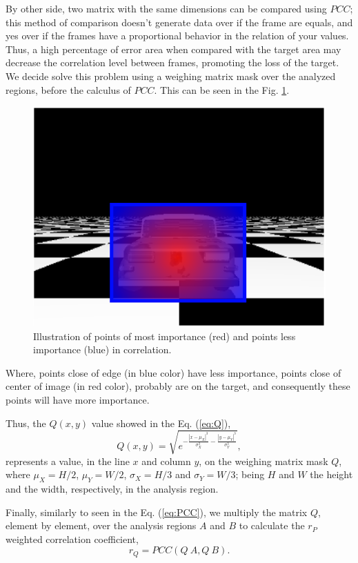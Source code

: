 By other side, two matrix with the same dimensions can be compared using $PCC$; 
this method of comparison doesn't generate data over if the frame are equals,
and yes over if the frames have a proportional behavior in the relation of your values. 
Thus, a high percentage of error area when compared with the target area 
may decrease the correlation level between frames, promoting the loss of the target. 
We decide solve this problem using a weighing matrix mask over the analyzed regions, 
before the calculus of $PCC$. This can be seen in the Fig. \ref{fig:errorpondered}.
\begin{figure}[H]
\includegraphics[width=\columnwidth]{images/imageErrorcontroled.eps}
\caption{Illustration of points of most importance (red) and points less importance (blue) in correlation.}
\label{fig:errorpondered}
\end{figure}
Where, points close of edge (in blue color) have less importance, 
points close of center of image (in red color), probably are on the target, and consequently
these points will have more importance. 

Thus, the $Q(x,y)$ value showed in the Eq. (\ref{eq:Q}), 
\begin{equation}\label{eq:Q}
 Q(x,y) = \sqrt{e^{ -\frac{|x-\mu_X|^3}{\sigma_X^3}-\frac{|y-\mu_Y|^3}{\sigma_Y^3}  }},
\end{equation}
represents a value, in the line $x$ and column $y$, on the weighing matrix mask $Q$,
where $\mu_X=H/2$, $\mu_Y=W/2$, $\sigma_X=H/3$ and $\sigma_Y=W/3$; being $H$ and $W$
the height and the width, respectively, in the analysis region.

Finally, similarly to seen in the Eq. (\ref{eq:PCC}), we multiply the matrix $Q$, 
element by element, over the analysis regions
$A$ and $B$ to calculate the $r_P$ weighted correlation coefficient, 
\begin{equation}\label{eq:rw}
 r_Q = PCC(Q~A, Q~B).
\end{equation}


